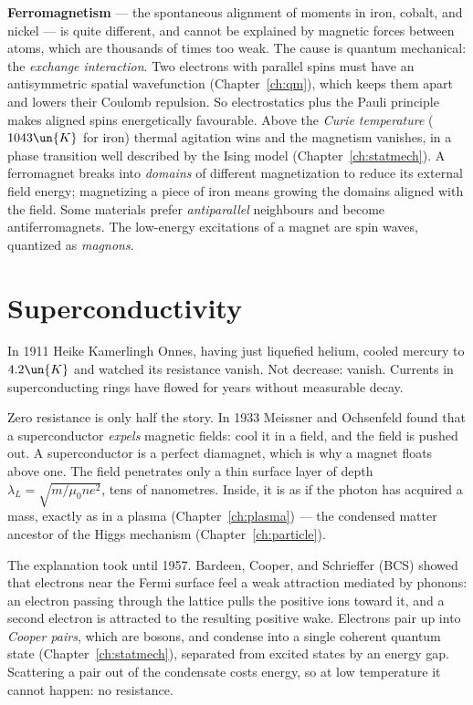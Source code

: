 \textbf{Ferromagnetism} --- the spontaneous alignment of moments in iron, cobalt, and nickel --- is quite different, and cannot be explained by magnetic forces between atoms, which are thousands of times too weak. The cause is quantum mechanical: the \emph{exchange interaction}. Two electrons with parallel spins must have an antisymmetric spatial wavefunction (Chapter~\ref{ch:qm}), which keeps them apart and lowers their Coulomb repulsion. So electrostatics plus the Pauli principle makes aligned spins energetically favourable. Above the \emph{Curie temperature} ($1043\un{K}$ for iron) thermal agitation wins and the magnetism vanishes, in a phase transition well described by the Ising model (Chapter~\ref{ch:statmech}). A ferromagnet breaks into \emph{domains} of different magnetization to reduce its external field energy; magnetizing a piece of iron means growing the domains aligned with the field. Some materials prefer \emph{antiparallel} neighbours and become antiferromagnets. The low-energy excitations of a magnet are spin waves, quantized as \emph{magnons}.

\section{Superconductivity}

In 1911 Heike Kamerlingh Onnes, having just liquefied helium, cooled mercury to $4.2\un{K}$ and watched its resistance vanish. Not decrease: vanish. Currents in superconducting rings have flowed for years without measurable decay.

Zero resistance is only half the story. In 1933 Meissner and Ochsenfeld found that a superconductor \emph{expels} magnetic fields: cool it in a field, and the field is pushed out. A superconductor is a perfect diamagnet, which is why a magnet floats above one. The field penetrates only a thin surface layer of depth $\lambda_L = \sqrt{m/\mu_0n e^2}$, tens of nanometres. Inside, it is as if the photon has acquired a mass, exactly as in a plasma (Chapter~\ref{ch:plasma}) --- the condensed matter ancestor of the Higgs mechanism (Chapter~\ref{ch:particle}).

The explanation took until 1957. Bardeen, Cooper, and Schrieffer (BCS) showed that electrons near the Fermi surface feel a weak attraction mediated by phonons: an electron passing through the lattice pulls the positive ions toward it, and a second electron is attracted to the resulting positive wake. Electrons pair up into \emph{Cooper pairs}, which are bosons, and condense into a single coherent quantum state (Chapter~\ref{ch:statmech}), separated from excited states by an energy gap. Scattering a pair out of the condensate costs energy, so at low temperature it cannot happen: no resistance.

